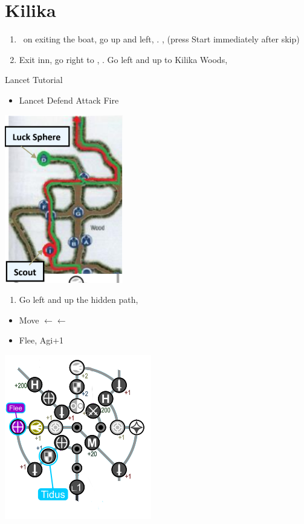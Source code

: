 \chapter{Kilika}

\begin{enumerate}
	\item \sd\ on exiting the boat, go up and left, \sd. \skippablefmv[2:00], (press Start immediately after skip) \sd
	\item Exit inn, go right to \wakka, \sd. Go left and up to Kilika Woods, \sd
\end{enumerate}
\begin{battle}{Lancet Tutorial}
	\begin{itemize}
		\item \sd
		      \kimahrif Lancet
		      \switch{\kimahri}{\yuna}
		      \yunaf Defend
		      \tidusf Attack
		      \luluf Fire
	\end{itemize}
\end{battle}
\includegraphics{graphics/kilikamap}
\begin{enumerate}[resume]
	\item Go left and up the hidden path, 
\end{enumerate}
\begin{spheregrid}
	\begin{itemize}
		\tidusf
		\begin{itemize}
			\item Move $\leftarrow\leftarrow$
			\item Flee, Agi+1
		\end{itemize}
	\end{itemize}
	\includegraphics{graphics/Tidus_Kilika}
\end{spheregrid}
